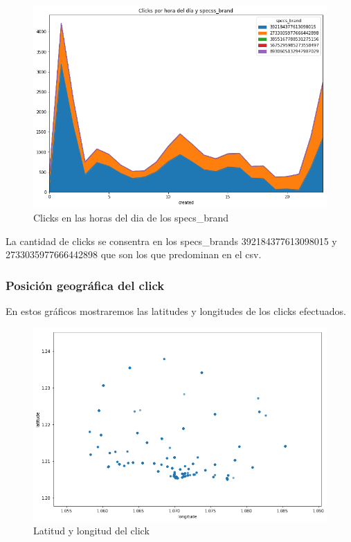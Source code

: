 \documentclass[a4paper, 12pt]{article}
\newcommand\tab[1][1cm]{\hspace*{#1}}
\begin{document}
		\FloatBarrier
		\begin{figure}[h]
			\centering
			\includegraphics[width=\textwidth]{images/clicks/clicks_specs_brand_hours.png}
			\caption{Clicks en las horas del dia de los specs\_brand}
		\end{figure}
		\FloatBarrier

		\tab La cantidad de clicks se consentra en los specs\_brands 392184377613098015 y 2733035977666442898 que son los que predominan en el csv.

	\subsubsection{Posición geográfica del click}
		
		\tab En estos gráficos mostraremos las latitudes y longitudes de los clicks efectuados.

		\FloatBarrier
		\begin{figure}[h]
			\centering
			\includegraphics[width=\textwidth]{images/clicks/clicks_lat_long_scatter.png}
			\caption{Latitud y longitud del click}
		\end{figure}
		\FloatBarrier
\end{document}
